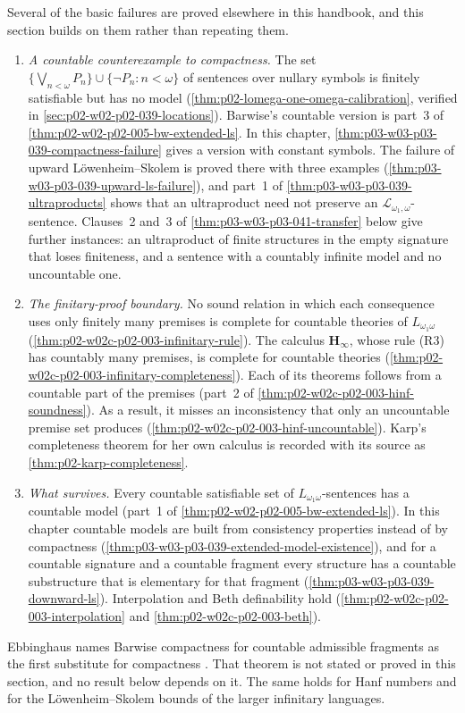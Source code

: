 Several of the basic failures are proved elsewhere in this handbook, and
this section builds on them rather than repeating them.
\begin{enumerate}
\item \emph{A countable counterexample to compactness.} The set
      \(\{\bigvee_{n<\omega}P_n\}\cup\{\neg P_n:n<\omega\}\) of
      sentences over nullary symbols is finitely satisfiable but has no
      model (\cref{thm:p02-lomega-one-omega-calibration}, verified in
      \cref{sec:p02-w02-p02-039-locations}). Barwise's countable version
      is part~3 of \cref{thm:p02-w02-p02-005-bw-extended-ls}. In this
      chapter, \cref{thm:p03-w03-p03-039-compactness-failure} gives a
      version with constant symbols. The failure of upward
      L\"owenheim--Skolem is proved there with three examples
      (\cref{thm:p03-w03-p03-039-upward-ls-failure}), and part~1 of
      \cref{thm:p03-w03-p03-039-ultraproducts} shows that an ultraproduct
      need not preserve an \(\mathcal L_{\omega_1,\omega}\)-sentence.
      Clauses~2 and~3 of \cref{thm:p03-w03-p03-041-transfer} below give
      further instances: an ultraproduct of finite structures in the empty
      signature that loses finiteness, and a sentence with a countably
      infinite model and no uncountable one.
\item \emph{The finitary-proof boundary.} No sound relation in which each
      consequence uses only finitely many premises is complete for
      countable theories of \(L_{\omega_1\omega}\)
      (\cref{thm:p02-w02c-p02-003-infinitary-rule}). The calculus
      \(\mathbf H_{\infty}\), whose rule (R3) has countably many premises,
      is complete for countable theories
      (\cref{thm:p02-w02c-p02-003-infinitary-completeness}). Each of its
      theorems follows from a countable part of the premises (part~2 of
      \cref{thm:p02-w02c-p02-003-hinf-soundness}). As a result, it misses
      an inconsistency that only an uncountable premise set produces
      (\cref{thm:p02-w02c-p02-003-hinf-uncountable}). Karp's completeness
      theorem for her own calculus is recorded with its source as
      \cref{thm:p02-karp-completeness}.
\item \emph{What survives.} Every countable satisfiable set of
      \(L_{\omega_1\omega}\)-sentences has a countable model (part~1 of
      \cref{thm:p02-w02-p02-005-bw-extended-ls}). In this chapter
      countable models are built from consistency properties instead of
      by compactness (\cref{thm:p03-w03-p03-039-extended-model-existence}),
      and for a countable signature and a countable fragment every
      structure has a countable substructure that is elementary for that
      fragment (\cref{thm:p03-w03-p03-039-downward-ls}). Interpolation and Beth
      definability hold (\cref{thm:p02-w02c-p02-003-interpolation} and
      \cref{thm:p02-w02c-p02-003-beth}).
\end{enumerate}
Ebbinghaus names Barwise compactness for countable admissible fragments
as the first substitute for compactness
\cite[Ch.~II, \S5.3, Example~1, p.~63]{Ebbinghaus1985ExtendedLogics}.
That theorem is not stated or proved in this section, and no result below
depends on it. The same holds for Hanf numbers and for the
L\"owenheim--Skolem bounds of the larger infinitary languages.

